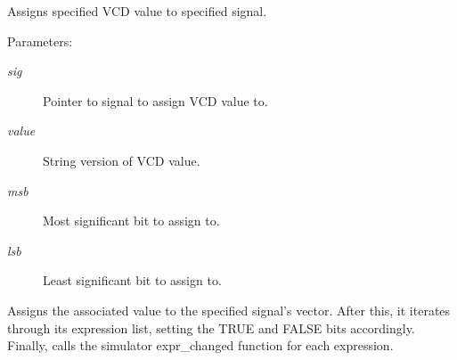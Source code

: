 Assigns specified VCD value to specified signal. 

\begin{Desc}
\item[Parameters:]
\begin{description}
\item[{\em sig}]Pointer to signal to assign VCD value to. \item[{\em value}]String version of VCD value. \item[{\em msb}]Most significant bit to assign to. \item[{\em lsb}]Least significant bit to assign to.\end{description}
\end{Desc}
Assigns the associated value to the specified signal's vector. After this, it iterates through its expression list, setting the TRUE and FALSE bits accordingly. Finally, calls the simulator expr\_\-changed function for each expression. 